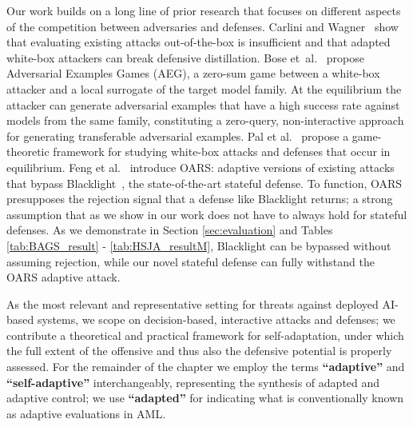 Our work builds on a long line of prior research that focuses on different aspects of the competition between adversaries and defenses.
Carlini and Wagner~\cite{carlini2017towards} show that evaluating existing attacks out-of-the-box is insufficient and that adapted white-box attackers can break defensive distillation.
Bose et~al.~\cite{bose2020adversarial} propose Adversarial Examples Games (AEG), a zero-sum game between a white-box attacker and a local surrogate of the target model family.
At the equilibrium the attacker can generate adversarial examples that have a high success rate against models from the same family, constituting a zero-query, non-interactive approach for generating transferable adversarial examples.
Pal et al.~\cite{pal2020game} propose a game-theoretic framework for studying white-box attacks and defenses that occur in equilibrium.
Feng et al.~\cite{feng2023stateful} introduce OARS: adaptive versions of existing attacks that bypass Blacklight~\cite{li2022blacklight}, the state-of-the-art stateful defense.
To function, OARS presupposes the rejection signal that a defense like Blacklight returns; a strong assumption that as we show in our work does not have to always hold for stateful defenses.
As we demonstrate in Section \ref{sec:evaluation} and Tables \ref{tab:BAGS_result} - \ref{tab:HSJA_resultM}, Blacklight can be bypassed without assuming rejection, while our novel stateful defense can fully withstand the OARS adaptive attack.

As the most relevant and representative setting for threats against deployed AI-based systems, we scope on decision-based, interactive attacks and defenses; we contribute a theoretical and practical framework for self-adaptation, under which the full extent of the offensive and thus also the defensive potential is properly assessed.
For the remainder of the chapter we employ the terms \textbf{``adaptive''} and \textbf{``self-adaptive''} interchangeably, representing the synthesis of adapted and adaptive control; we use \textbf{``adapted''} for indicating what is conventionally known as adaptive evaluations in \gls{AML}.

